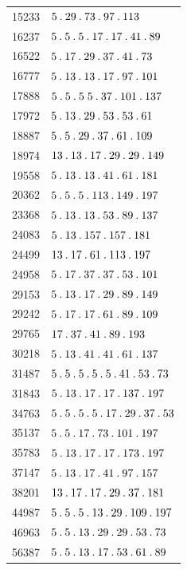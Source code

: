 \begin{longtable}{@{}r|l@{}}
15233 & $5\pdot 29\pdot 73\pdot 97\pdot 113$\\
16237 & $5\pdot 5\pdot 5\pdot 17\pdot 17\pdot 41\pdot 89$\\
16522 & $5\pdot 17\pdot 29\pdot 37\pdot 41\pdot 73$\\
16777 & $5\pdot 13\pdot 13\pdot 17\pdot 97\pdot 101$\\
17888 & $5\pdot 5\pdot 5\;5\pdot 37\pdot 101\pdot 137$\\
17972 & $5\pdot 13\pdot 29\pdot 53\pdot 53\pdot 61$\\
18887 & $5\pdot 5\pdot 29\pdot 37\pdot 61\pdot 109$\\
18974 & $13\pdot 13\pdot 17\pdot 29\pdot 29\pdot 149$\\
19558 & $5\pdot 13\pdot 13\pdot 41\pdot 61\pdot 181$\\
20362 & $5\pdot 5\pdot 5\pdot 113\pdot 149\pdot 197$\\
23368 & $5\pdot 13\pdot 13\pdot 53\pdot 89\pdot 137$\\
24083 & $5\pdot 13\pdot 157\pdot 157\pdot 181$\\
24499 & $13\pdot 17\pdot 61\pdot 113\pdot 197$\\
24958 & $5\pdot 17\pdot 37\pdot 37\pdot 53\pdot 101$\\
29153 & $5\pdot 13\pdot 17\pdot 29\pdot 89\pdot 149$\\
29242 & $5\pdot 17\pdot 17\pdot 61\pdot 89\pdot 109$\\
29765 & $17\pdot 37\pdot 41\pdot 89\pdot 193$\\
30218 & $5\pdot 13\pdot 41\pdot 41\pdot 61\pdot 137$\\
31487 & $5\pdot 5\pdot 5\pdot 5\pdot 5\pdot 41\pdot 53\pdot 73$\\
31843 & $5\pdot 13\pdot 17\pdot 17\pdot 137\pdot 197$\\
34763 & $5\pdot 5\pdot 5\pdot 5\pdot 17\pdot 29\pdot 37\pdot 53$\\
35137 & $5\pdot 5\pdot 17\pdot 73\pdot 101\pdot 197$\\
35783 & $5\pdot 13\pdot 17\pdot 17\pdot 173\pdot 197$\\
37147 & $5\pdot 13\pdot 17\pdot 41\pdot 97\pdot 157$\\
38201 & $13\pdot 17\pdot 17\pdot 29\pdot 37\pdot 181$\\
44987 & $5\pdot 5\pdot 5\pdot 13\pdot 29\pdot 109\pdot 197$\\
46963 & $5\pdot 5\pdot 13\pdot 29\pdot 29\pdot 53\pdot 73$\\
56387 & $5\pdot 5\pdot 13\pdot 17\pdot 53\pdot 61\pdot 89$\\

\end{longtable}
